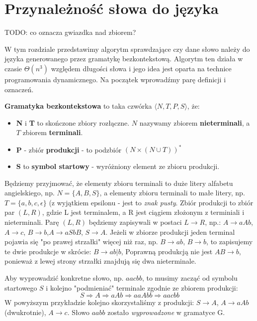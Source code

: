 \section{Przynależność słowa do języka}

\label{sec:gramatyki}

TODO: co oznacza gwiazdka nad zbiorem?

W tym rozdziale przedstawimy algorytm sprawdzające czy dane słowo należy do języka generowanego przez gramatykę bezkontekstową.
Algorytm ten działa w czasie $\Theta(n^3)$ względem długości słowa i jego idea jest oparta na technice programowania dynamicznego.
Na początek wprowadźmy parę definicji i oznaczeń.

\begin{definition}
\textbf{Gramatyka bezkontekstowa} to taka czwórka $\langle N, T, P, S \rangle$, że:
    \begin{itemize}
    	\item \textbf{N} i \textbf{T} to skończone zbiory rozłączne. 
        $N$ nazywamy zbiorem \textbf{nieterminali}, a $T$ zbiorem \textbf{terminali}.
        \item \textbf{P} - zbiór \textbf{produkcji} - to podzbiór $(N \times (N\cup T ))^*$
        \item \textbf{S} to \textbf{symbol startowy} - wyróżniony element ze zbioru produkcji.
    \end{itemize}
\end{definition}
Będziemy przyjmować, że elementy zbioru terminali to duże litery alfabetu angielskiego, np. $N = \{ A, B, S\}$, a elementy zbioru terminali to małe litery, np. $T = \{ a, b, c, \epsilon\}$ (z wyjątkiem epsilonu - jest to \textit{znak pusty}.
Zbiór produkcji to zbiór par $(L, R)$, gdzie L jest terminalem, a R jest ciągiem złożonym z terminiali i nieterminali. 
Parę $(L, R)$ będziemy zapisywali w postaci $L \rightarrow R$, np.: $A \rightarrow aAb$, $A \rightarrow c$, $B \rightarrow b$,$A \rightarrow aSbB$, $S \rightarrow A$. 
Jeżeli w zbiorze produkcji jeden terminal pojawia się "po prawej strzałki" więcej niż raz, np. $B \rightarrow ab$, $B \rightarrow b$, to zapisujemy te dwie produkcje w skrócie: $B \rightarrow ab |  b$, 
Poprawną produkcją nie jest $AB \rightarrow b$, ponieważ z lewej strony strzałki znajdują się dwa nieterminale.

Aby wyprowadzić konkretne słowo, np. $aacbb$, to musimy zacząć od symbolu startowego $S$ i kolejno "podmieniać" terminale zgodnie ze zbiorem produkcji:
 \[ S \Rightarrow A \Rightarrow aAb \Rightarrow aaAbb \Rightarrow aacbb \]
W powyższym przykładzie kolejno skorzystaliśmy z produkcji: $S \rightarrow A$, $A \rightarrow aAb$ (dwukrotnie),   $A \rightarrow c$. Słowo $aabb$ zostało \textit{wyprowadzone} w gramatyce G.

